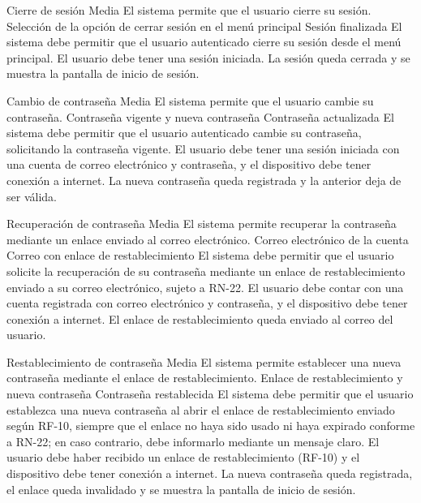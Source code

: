   {Cierre de sesión}%
  {Media}%
  {El sistema permite que el usuario cierre su sesión.}%
  {Selección de la opción de cerrar sesión en el menú principal}%
  {Sesión finalizada}%
  {El sistema debe permitir que el usuario autenticado cierre su sesión desde el menú principal.}%
  {El usuario debe tener una sesión iniciada.}%
  {La sesión queda cerrada y se muestra la pantalla de inicio de sesión.}%

  {Cambio de contraseña}%
  {Media}%
  {El sistema permite que el usuario cambie su contraseña.}%
  {Contraseña vigente y nueva contraseña}%
  {Contraseña actualizada}%
  {El sistema debe permitir que el usuario autenticado cambie su contraseña, solicitando la contraseña vigente.}%
  {El usuario debe tener una sesión iniciada con una cuenta de correo electrónico y contraseña, y el dispositivo debe tener conexión a internet.}%
  {La nueva contraseña queda registrada y la anterior deja de ser válida.}%

  {Recuperación de contraseña}%
  {Media}%
  {El sistema permite recuperar la contraseña mediante un enlace enviado al correo electrónico.}%
  {Correo electrónico de la cuenta}%
  {Correo con enlace de restablecimiento}%
  {El sistema debe permitir que el usuario solicite la recuperación de su contraseña mediante un enlace de restablecimiento enviado a su correo electrónico, sujeto a RN-22.}%
  {El usuario debe contar con una cuenta registrada con correo electrónico y contraseña, y el dispositivo debe tener conexión a internet.}%
  {El enlace de restablecimiento queda enviado al correo del usuario.}%

  {Restablecimiento de contraseña}%
  {Media}%
  {El sistema permite establecer una nueva contraseña mediante el enlace de restablecimiento.}%
  {Enlace de restablecimiento y nueva contraseña}%
  {Contraseña restablecida}%
  {El sistema debe permitir que el usuario establezca una nueva contraseña al abrir el enlace de restablecimiento enviado según RF-10, siempre que el enlace no haya sido usado ni haya expirado conforme a RN-22; en caso contrario, debe informarlo mediante un mensaje claro.}%
  {El usuario debe haber recibido un enlace de restablecimiento (RF-10) y el dispositivo debe tener conexión a internet.}%
  {La nueva contraseña queda registrada, el enlace queda invalidado y se muestra la pantalla de inicio de sesión.}%

